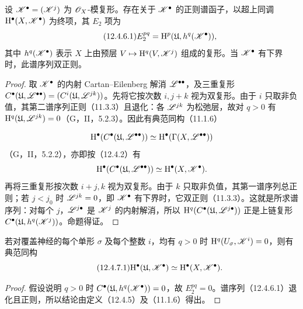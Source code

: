 设 $\mathscr K^\bullet=(\mathscr K^j)$ 为 $\mathscr O_X$-模复形。存在关于 $\mathscr K^\bullet$ 的正则谱函子，以超上同调 $\mathrm H^\bullet(X,\mathscr K^\bullet)$ 为终项，其 $E_2$ 项为
\begin{equation}\tag{12.4.6.1}
E_2^{pq}=\mathrm H^p(\mathfrak U,h^q(\mathscr K^\bullet)),
\end{equation}
其中 $h^q(\mathscr K^\bullet)$ 表示 $X$ 上由预层 $V\mapsto\mathrm H^q(V,\mathscr K^j)$ 组成的复形。当 $\mathscr K^\bullet$ 有下界时，此谱序列双正则。
\begin{proof}
\begin{sloppypar}
取 $\mathscr K^\bullet$ 的内射 Cartan--Eilenberg 解消 $\mathscr L^{\bullet\bullet}$，及三重复形 $C^\bullet(\mathfrak U,\mathscr L^{\bullet\bullet})=(C^i(\mathfrak U,\mathscr L^{jk}))$。先将它按次数 $i,j+k$ 视为双复形。由于 $i$ 只取非负值，其第二谱序列正则（11.3.3）且退化：各 $\mathscr L^{jk}$ 为松弛层，故对 $q>0$ 有 $\mathrm H^q(\mathfrak U,\mathscr L^{jk})=0$（G，II，5.2.3）。因此有典范同构（11.1.6）
\end{sloppypar}
\[
\mathrm H^\bullet(C^\bullet(\mathfrak U,\mathscr L^{\bullet\bullet}))
\simeq\mathrm H^\bullet(\Gamma(X,\mathscr L^{\bullet\bullet}))
\]
（G，II，5.2.2），亦即按（12.4.2）有
\[
\mathrm H^\bullet(C^\bullet(\mathfrak U,\mathscr L^{\bullet\bullet}))
\simeq\mathrm H^\bullet(X,\mathscr K^\bullet).
\]
再将三重复形按次数 $i+j,k$ 视为双复形。由于 $k$ 只取非负值，其第一谱序列总正则；若 $j<j_0$ 时 $\mathscr L^{jk}=0$，即 $\mathscr K^\bullet$ 有下界时，它双正则（11.3.3）。这就是所求谱序列：对每个 $j$，$\mathscr L^{j\bullet}$ 是 $\mathscr K^j$ 的内射解消，所以 $\mathrm H^q(C^\bullet(\mathfrak U,\mathscr L^{j\bullet}))$ 正是上链复形 $C^\bullet(\mathfrak U,h^q(\mathscr K^j))$。命题得证。
\end{proof}

若对覆盖神经的每个单形 $\sigma$ 及每个整数 $i$，均有 $q>0$ 时 $\mathrm H^q(U_\sigma,\mathscr K^i)=0$，则有典范同构
\begin{equation}\tag{12.4.7.1}
\mathrm H^\bullet(\mathfrak U,\mathscr K^\bullet)\simeq\mathrm H^\bullet(X,\mathscr K^\bullet).
\end{equation}
\begin{proof}
假设说明 $q>0$ 时 $C^\bullet(\mathfrak U,h^q(\mathscr K^\bullet))=0$，故 $E_2^{pq}=0$。谱序列（12.4.6.1）退化且正则，所以结论由定义（12.4.5）及（11.1.6）得出。
\end{proof}

